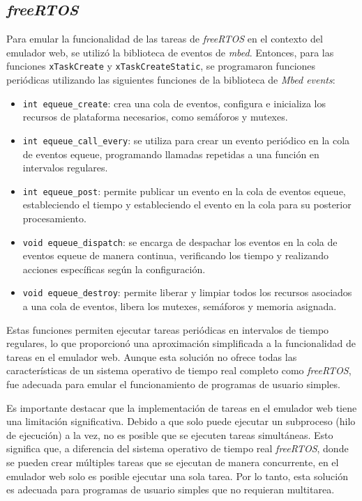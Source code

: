 \subsection{\textit{\textbf{freeRTOS}}}

Para emular la funcionalidad de las tareas de \textit{freeRTOS} en el contexto del emulador web, se utilizó la biblioteca de eventos de \textit{mbed}. Entonces, para las funciones \texttt{xTaskCreate} y \texttt{xTaskCreateStatic}, se programaron funciones periódicas utilizando las siguientes funciones de la biblioteca de \textit{Mbed events}: 

 
 \begin{itemize}
	\item \texttt{int equeue\_create}:  crea una cola de eventos, configura e inicializa los recursos de plataforma necesarios, como semáforos y mutexes.
	
	\item \texttt{int equeue\_call\_every}:  se utiliza para crear un evento periódico en la cola de eventos equeue, programando llamadas repetidas a una función en intervalos regulares.
	
	\item \texttt{int equeue\_post}: permite publicar un evento en la cola de eventos equeue, estableciendo el tiempo y estableciendo el evento en la cola para su posterior procesamiento.
	
	\item \texttt{void equeue\_dispatch}: se encarga de despachar los eventos en la cola de eventos equeue de manera continua, verificando los tiempo y realizando acciones específicas según la configuración.

	\item \texttt{void equeue\_destroy}: permite liberar y limpiar todos los recursos asociados a una cola de eventos, libera los mutexes, semáforos y memoria asignada.
\end{itemize}

Estas funciones permiten ejecutar tareas periódicas en intervalos de tiempo regulares, lo que proporcionó una aproximación simplificada a la funcionalidad de tareas en el emulador web. Aunque esta solución no ofrece todas las características de un sistema operativo de tiempo real completo como \textit{freeRTOS}, fue adecuada para emular el funcionamiento de programas de usuario simples.

Es importante destacar que la implementación de tareas en el emulador web tiene una limitación significativa. Debido a que solo puede ejecutar un subproceso (hilo de ejecución) a la vez, no es posible que se ejecuten tareas simultáneas. Esto significa que, a diferencia del sistema operativo de tiempo real \textit{freeRTOS}, donde se pueden crear múltiples tareas que se ejecutan de manera concurrente, en el emulador web solo es posible ejecutar una sola tarea. Por lo tanto, esta solución es adecuada para programas de usuario simples que no requieran multitarea.


